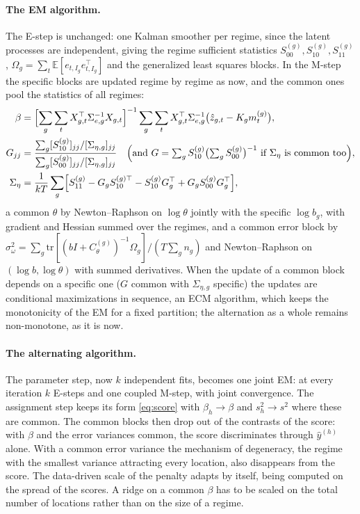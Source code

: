 \documentclass[11pt]{article}
\newcommand{\E}{\mathbb{E}}
\begin{document}
\paragraph{The EM algorithm.} The E-step is unchanged: one Kalman smoother per regime, since the latent processes are independent, giving the regime sufficient statistics $S^{(g)}_{00}, S^{(g)}_{10}, S^{(g)}_{11}$, $\Omega_g = \sum_t \E[e_{t,I_g} e_{t,I_g}^\top]$ and the generalized least squares blocks. In the M-step the specific blocks are updated regime by regime as now, and the common ones pool the statistics of all regimes:
\begin{align*}
  \beta &= \Bigl[\sum_g \sum_t X_{g,t}^\top \Sigma_{e,g}^{-1} X_{g,t}\Bigr]^{-1} \sum_g \sum_t X_{g,t}^\top \Sigma_{e,g}^{-1}\bigl(\hat z_{g,t} - K_g m^{(g)}_t\bigr), \\
  G_{jj} &= \frac{\sum_g [S^{(g)}_{10}]_{jj} / [\Sigma_{\eta,g}]_{jj}}{\sum_g [S^{(g)}_{00}]_{jj} / [\Sigma_{\eta,g}]_{jj}}
     \quad\Bigl(\text{and } G = \textstyle\sum_g S^{(g)}_{10}\bigl(\sum_g S^{(g)}_{00}\bigr)^{-1} \text{ if } \Sigma_\eta \text{ is common too}\Bigr), \\
  \Sigma_\eta &= \frac{1}{kT}\sum_g \Bigl[S^{(g)}_{11} - G_g S^{(g)\top}_{10} - S^{(g)}_{10} G_g^\top + G_g S^{(g)}_{00} G_g^\top\Bigr],
\end{align*}
a common $\theta$ by Newton--Raphson on $\log\theta$ jointly with the specific $\log b_g$, with gradient and Hessian summed over the regimes, and a common error block by $\sigma^2_\omega = \sum_g \mathrm{tr}[(bI + C^{(g)}_\theta)^{-1}\Omega_g] / (T\sum_g n_g)$ and Newton--Raphson on $(\log b, \log\theta)$ with summed derivatives. When the update of a common block depends on a specific one ($G$ common with $\Sigma_{\eta,g}$ specific) the updates are conditional maximizations in sequence, an ECM algorithm, which keeps the monotonicity of the EM for a fixed partition; the alternation as a whole remains non-monotone, as it is now.

\paragraph{The alternating algorithm.} The parameter step, now $k$ independent fits, becomes one joint EM: at every iteration $k$ E-steps and one coupled M-step, with joint convergence. The assignment step keeps its form \eqref{eq:score} with $\beta_h \to \beta$ and $s^2_h \to s^2$ where these are common. The common blocks then drop out of the contrasts of the score: with $\beta$ and the error variances common, the score discriminates through $\hat y^{(h)}$ alone. With a common error variance the mechanism of degeneracy, the regime with the smallest variance attracting every location, also disappears from the score. The data-driven scale of the penalty adapts by itself, being computed on the spread of the scores. A ridge on a common $\beta$ has to be scaled on the total number of locations rather than on the size of a regime.
\end{document}
